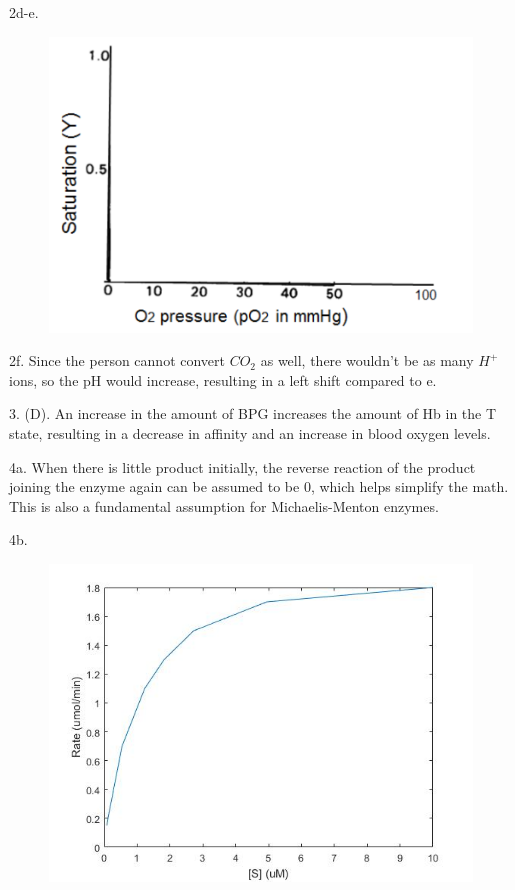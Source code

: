 \documentclass{article}
\begin{document}
2d-e. \begin{figure}[h]
  \centering
  \includegraphics[scale=0.25]{PartialPressureBlank.png}
\end{figure}

2f. Since the person cannot convert $CO_2$ as well, there wouldn't be as many $H^+$ ions, so the pH would increase, resulting in a left shift compared to e.

3. (D). An increase in the amount of BPG increases the amount of Hb in the T state, resulting in a decrease in affinity and an increase in blood oxygen levels.

4a. When there is little product initially, the reverse reaction of the product joining the enzyme again can be assumed to be 0, which helps simplify the math. This is also a fundamental assumption for Michaelis-Menton enzymes.

4b. \begin{figure}[h]
  \centering
  \includegraphics[scale=0.4]{michaelis-menton.jpg}
\end{figure}
\end{document}
